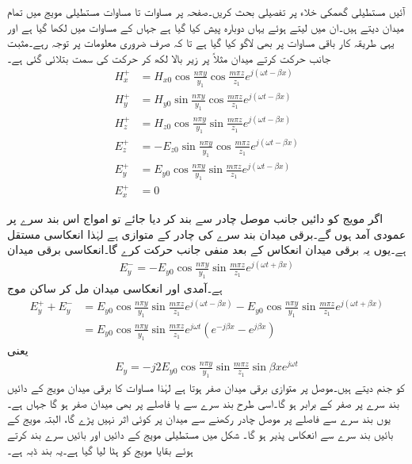 آئیں مستطیلی گھمکی خلاء پر تفصیلی بحث کریں۔صفحہ  پر مساوات  تا مساوات  مستطیلی مویج میں تمام میدان دیتے ہیں۔ان میں  لیتے ہوئے  یہاں دوبارہ پیش کیا گیا ہے جہاں  کے مساوات میں  لکھا گیا ہے اور یہی طریقہ کار باقی مساوات پر بھی لاگو کیا گیا ہے تا کہ صرف ضروری معلومات پر توجہ رہے۔مثبت  جانب حرکت کرتے میدان مثلاً  پر زیر بالا  لکھ کر حرکت کی سمت بتلائی گئی ہے۔
 \begin{align}
H_x^{+}&=H_{x0} \cos \frac{n \pi y}{y_1}  \cos  \frac{m \pi z}{z_1} e^{j (\omega t -\beta x)}\\
H_y^{+}&=H_{y0} \sin \frac{n\pi y}{y_1} \cos \frac{m \pi z}{z_1} e^{j (\omega t -\beta x)} \\
H_z^{+}&=H_{z0} \cos \frac{n\pi y}{y_1} \sin \frac{m \pi z}{z_1} e^{j (\omega t -\beta x)}\\
E_z^{+}&=-E_{z0} \sin \frac{n\pi y}{y_1} \cos \frac{m \pi z}{z_1} e^{j (\omega t -\beta x)}\\
E_y^{+}&=E_{y0}\cos \frac{n\pi y}{y_1} \sin \frac{m \pi z}{z_1} e^{j (\omega t -\beta x)}\\
E_x^{+}&=0
\end{align}

اگر مویج کو دائیں جانب موصل چادر سے بند کر دیا جائے تو امواج اس بند سرے پر عمودی آمد ہوں گے۔برقی میدان  بند سرے کی چادر کے متوازی ہے لہٰذا انعکاسی مستقل  ہے۔یوں یہ برقی میدان انعکاس کے بعد منفی  جانب حرکت کرے گا۔انعکاسی برقی میدان
\begin{align}
E_y^{-}=-E_{y0}\cos \frac{n\pi y}{y_1} \sin \frac{m \pi z}{z_1} e^{j (\omega t +\beta x)}
\end{align} 
ہے۔آمدی اور انعکاسی میدان مل کر ساکن موج
\begin{align*}
E_y^{+}+E_y^{-}&=E_{y0}\cos \frac{n\pi y}{y_1} \sin \frac{m \pi z}{z_1} e^{j (\omega t -\beta x)}-E_{y0}\cos \frac{n\pi y}{y_1} \sin \frac{m \pi z}{z_1} e^{j (\omega t +\beta x)}\\
&=E_{y0}\cos \frac{n\pi y}{y_1} \sin \frac{m \pi z}{z_1}e^{j\omega t} \left(e^{-j\beta  x} - e^{j \beta x}\right)
\end{align*}
یعنی
\begin{align}\label{مساوات_مویج_گھمکی_برقی_الف}
E_y=-j 2 E_{y0}\cos \frac{n\pi y}{y_1} \sin \frac{m \pi z}{z_1} \sin \beta x e^{j\omega t}
\end{align}
کو جنم دیتے ہیں۔موصل پر متوازی برقی میدان صفر ہوتا ہے لہٰذا مساوات  کا برقی میدان مویج کے دائیں بند سرے پر صفر کے برابر ہو گا۔اسی طرح بند سرے سے  یا   فاصلے پر بھی میدان صفر ہو گا جہاں  ہے۔ یوں بند سرے سے  فاصلے پر موصل چادر رکھنے سے میدان پر کوئی اثر نہیں پڑے گا، البتہ  مویج کے  بائیں بند سرے سے انعکاس پذیر ہو گا۔ شکل  میں مستطیلی مویج کے دائیں اور بائیں سرے بند کرتے ہوئے بقایا مویج کو ہٹا لیا گیا ہے۔یہ بند ڈبہ  ہے۔  

